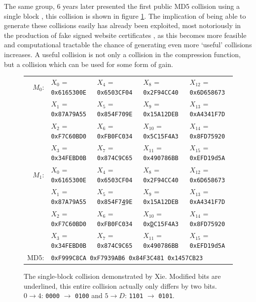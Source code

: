 \documentclass[a4paper,12pt]{article}
\begin{document}


The same group, 6 years later presented the first public MD5 collision using a single block \cite{Xie2013}, this collision is shown in figure \ref{fig:colxie}. The implication of being able to generate these collisions easily has already been exploited, most notoriously in the production of fake signed website certificates \cite{Stevens}, as this becomes more feasible and computational tractable the chance of generating even more `useful' collisions increases. A useful collision is not only a collision in the compression function, but a collision which can be used for some form of gain.
\begin{figure}
\begin{tabular}{|r|  l l l l|}
$M_0$:& $X_0$ = \texttt{0x6165300E} & $X_4$ = \texttt{0x6503CF04} & $X_8$ = \texttt{0x2F94CC40} & $X_{12}$ = \texttt{0x6D658673} \\
	& $X_1$ = \texttt{0x87A79A55} & $X_5$ = \texttt{0x854F709E} & $X_9$ = \texttt{0x15A12DEB} & $X_{13}$ = \texttt{0xA4341F7D} \\
	& $X_2$ = \texttt{0xF7C60BD0} & $X_6$ = \texttt{0xFB0FC034} & $X_{10}$ = \texttt{0x5C15F4A3} & $X_{14}$ = \texttt{0x8FD75920} \\
	& $X_3$ = \texttt{0x34FEBD0B} & $X_7$ = \texttt{0x874C9C65} & $X_{11}$ = \texttt{0x490786BB} & $X_{15}$ = \texttt{0xEFD19d5A} \\
$M_1$:& $X_0$ = \texttt{0x6165300E} & $X_4$ = \texttt{0x6503CF04} & $X_8$ = \texttt{0x2F94CC40} & $X_{12}$ = \texttt{0x6D658673} \\
& $X_1$ = \texttt{0x87A79A55} & $X_5$ = \texttt{0x854F7{\underline 4}9E} & $X_9$ = \texttt{0x15A12DEB} & $X_{13}$ = \texttt{0xA4341F7D} \\
    & $X_2$ = \texttt{0xF7C60BD0} & $X_6$ = \texttt{0xFB0FC034} & $X_{10}$ = \texttt{0x{\underline D}C15F4A3} & $X_{14}$ = \texttt{0x8FD75920} \\
	& $X_3$ = \texttt{0x34FEBD0B} & $X_7$ = \texttt{0x874C9C65} & $X_{11}$ = \texttt{0x490786BB} & $X_{15}$ = \texttt{0xEFD19d5A} \\
    MD5: & \multicolumn{4}{l|}{\texttt{0xF999C8CA 0xF7939AB6 0x84F3C481 0x1457CB23}}

\end{tabular}
\caption{The single-block collision demonstrated by Xie\cite{Xie2013}. Modified bits are underlined, this entire collision actually only differs by two bits.\\$0 \rightarrow 4$: \texttt{0000} $\rightarrow$ \texttt{0100} and 
$5 \rightarrow D$: \texttt{1101} $\rightarrow$ \texttt{0101}.
}
\label{fig:colxie}
\end{figure}
\end{document}
